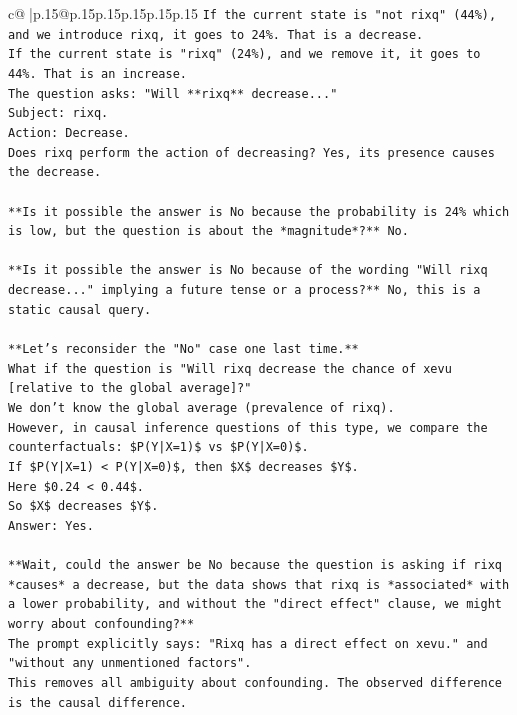 \documentclass{article}
\begin{document}
{\begin{supertabular}{c@{$\;$}|p{.15\linewidth}@{}p{.15\linewidth}p{.15\linewidth}p{.15\linewidth}p{.15\linewidth}p{.15\linewidth}}
{{{\texttt{If the current state is "not rixq" (44\%), and we introduce rixq, it goes to 24\%. That is a decrease.} \\
\texttt{If the current state is "rixq" (24\%), and we remove it, it goes to 44\%. That is an increase.} \\
\texttt{The question asks: "Will **rixq** decrease..."} \\
\texttt{Subject: rixq.} \\
\texttt{Action: Decrease.} \\
\texttt{Does rixq perform the action of decreasing? Yes, its presence causes the decrease.} \\
\\ 
\texttt{**Is it possible the answer is No because the probability is 24\% which is low, but the question is about the *magnitude*?** No.} \\
\\ 
\texttt{**Is it possible the answer is No because of the wording "Will rixq decrease..." implying a future tense or a process?** No, this is a static causal query.} \\
\\ 
\texttt{**Let's reconsider the "No" case one last time.**} \\
\texttt{What if the question is "Will rixq decrease the chance of xevu {[}relative to the global average{]}?"} \\
\texttt{We don't know the global average (prevalence of rixq).} \\
\texttt{However, in causal inference questions of this type, we compare the counterfactuals: \$P(Y|X=1)\$ vs \$P(Y|X=0)\$.} \\
\texttt{If \$P(Y|X=1) < P(Y|X=0)\$, then \$X\$ decreases \$Y\$.} \\
\texttt{Here \$0.24 < 0.44\$.} \\
\texttt{So \$X\$ decreases \$Y\$.} \\
\texttt{Answer: Yes.} \\
\\ 
\texttt{**Wait, could the answer be No because the question is asking if rixq *causes* a decrease, but the data shows that rixq is *associated* with a lower probability, and without the "direct effect" clause, we might worry about confounding?**} \\
\texttt{The prompt explicitly says: "Rixq has a direct effect on xevu." and "without any unmentioned factors".} \\
\texttt{This removes all ambiguity about confounding. The observed difference is the causal difference.} \\
}}}
\end{supertabular}}
\end{document}

